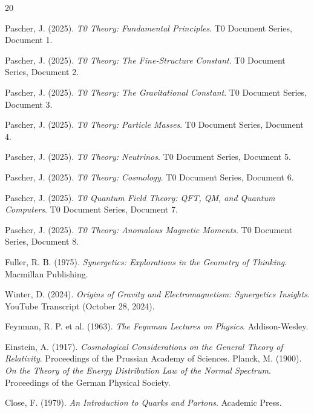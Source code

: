 	\begin{thebibliography}{20}
		
		Pascher, J. (2025). 
		\textit{T0 Theory: Fundamental Principles}. 
		T0 Document Series, Document 1.
		
		Pascher, J. (2025). 
		\textit{T0 Theory: The Fine-Structure Constant}. 
		T0 Document Series, Document 2.
		
		Pascher, J. (2025). 
		\textit{T0 Theory: The Gravitational Constant}. 
		T0 Document Series, Document 3.
		
		Pascher, J. (2025). 
		\textit{T0 Theory: Particle Masses}. 
		T0 Document Series, Document 4.
		
		Pascher, J. (2025). 
		\textit{T0 Theory: Neutrinos}. 
		T0 Document Series, Document 5.
		
		Pascher, J. (2025). 
		\textit{T0 Theory: Cosmology}. 
		T0 Document Series, Document 6.
		
		Pascher, J. (2025). 
		\textit{T0 Quantum Field Theory: QFT, QM, and Quantum Computers}. 
		T0 Document Series, Document 7.
		
		Pascher, J. (2025). 
		\textit{T0 Theory: Anomalous Magnetic Moments}. 
		T0 Document Series, Document 8.
		
		Fuller, R. B. (1975). 
		\textit{Synergetics: Explorations in the Geometry of Thinking}. 
		Macmillan Publishing.
		
		Winter, D. (2024). 
		\textit{Origins of Gravity and Electromagnetism: Synergetics Insights}. 
		YouTube Transcript (October 28, 2024).
		
		Feynman, R. P. et al. (1963). 
		\textit{The Feynman Lectures on Physics}. 
		Addison-Wesley.
		
		Einstein, A. (1917). 
		\textit{Cosmological Considerations on the General Theory of Relativity}. 
		Proceedings of the Prussian Academy of Sciences.
Planck, M. (1900). 
\textit{On the Theory of the Energy Distribution Law of the Normal Spectrum}. 
Proceedings of the German Physical Society.

Close, F. (1979). 
\textit{An Introduction to Quarks and Partons}. 
Academic Press.


\end{thebibliography}
